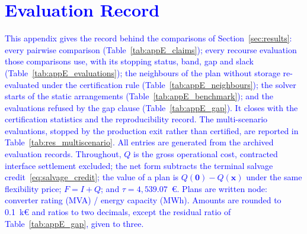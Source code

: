 \documentclass[preprint,12pt]{elsarticle}
\begin{document}
\clearpage
\section{\textcolor{blue}{Evaluation Record}}
\label{app:results}

\textcolor{blue}{
    This appendix gives the record behind the comparisons of Section~\ref{sec:results}: every pairwise comparison (Table~\ref{tab:appE_claims}); every recourse evaluation those comparisons use, with its stopping status, band, gap and slack (Table~\ref{tab:appE_evaluations}); the neighbours of the plan without storage re-evaluated under the certification rule (Table~\ref{tab:appE_neighbours}); the solver starts of the static arrangements (Table~\ref{tab:appE_benchmark}); and the evaluations refused by the gap clause (Table~\ref{tab:appE_gap}). It closes with the certification statistics and the reproducibility record. The multi-scenario evaluations, stopped by the production exit rather than certified, are reported in Table~\ref{tab:res_multiscenario}. All entries are generated from the archived evaluation records. Throughout, $Q$ is the gross operational cost, contracted interface settlement excluded; the net form subtracts the terminal salvage credit~\eqref{eq:salvage_credit}; the value of a plan is $Q(\boldsymbol{0}) - Q(\boldsymbol{x})$ under the same flexibility price; $F = I + Q$; and $\tau = 4{,}539.07$~\euro{}. Plans are written node: converter rating (MVA) / energy capacity (MWh). Amounts are rounded to 0.1~k\euro{} and ratios to two decimals, except the residual ratio of Table~\ref{tab:appE_gap}, given to three.
}
\end{document}
